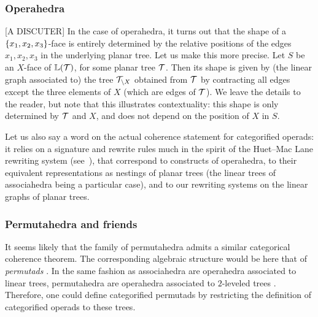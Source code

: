\subsubsection{Operahedra}[A DISCUTER]
In the case of operahedra, it turns out that the shape of a $\left\{x_1,x_2,x_3\right\}$-face is entirely determined by the relative positions of the edges $x_1,x_2,x_3$ in the underlying  planar tree.  Let us make this more precise.
Let $S$ be an $X$-face of $\mathbb{L}({\cal T})$, for some  planar tree $\cal T$. Then its shape is given by (the linear graph associated to)  the tree ${\cal T}_{\setminus X}$ obtained from  ${\cal T}$  by contracting all edges except the three elements of $X$ (which are edges of ${\cal T}$).  We leave the details to the reader, but note that
this illustrates contextuality: this shape is only determined by ${\cal T}$ and $X$, and does not depend on the position of $X$ in $S$.

Let us also say a word on the actual coherence statement for categorified operads: it relies on a signature and rewrite rules much in the spirit of the Huet--Mac Lane rewriting system (see~\cite{DP15,laplante-anfossiDiagonalOperahedra2022a,CLA1}), that correspond to  constructs of operahedra,  to their equivalent representations as nestings of planar trees (the linear trees of associahedra being a particular case), and to our rewriting systems on the linear graphs of planar trees. 


\subsubsection{Permutahedra and friends}
It seems likely that the family of permutahedra admits a similar categorical coherence theorem. 
The corresponding algebraic structure would be here that of \emph{permutads} \cite{LodayRonco11,Markl19}. 
In the same fashion as associahedra are operahedra associated to linear trees, permutahedra are operahedra associated to $2$-leveled trees \cite{laplante-anfossiDiagonalOperahedra2022a}.
Therefore, one could define categorified permutads by restricting the definition of categorified operads \cite{CLA1} to these trees.

